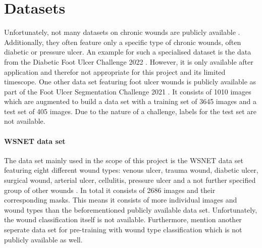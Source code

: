 \section{Datasets}

Unfortunately, not many datasets on chronic wounds are publicly available \cite{Oota_2023_WACV}. Additionally, they often feature only a specific type of chronic wounds, often diabetic or pressure ulcer. An example for such a specialised dataset is the data from the Diabetic Foot Ulcer Challenge 2022 \cite{DFUC2022}. However, it is only available after application and therefor not appropriate for this project and its limited timescope. One other data set featuring foot ulcer wounds is publicly available as part of the Foot Ulcer Segmentation Challenge 2021 \cite{Wang2020}. It consists of 1010 images which are augmented to build a data set with a training set of 3645 images and a test set of 405 images. Due to the nature of a challenge, labels for the test set are not available.

\paragraph{WSNET data set} The data set mainly used in the scope of this project is the WSNET data set featuring eight different wound types: venous ulcer, trauma wound, diabetic ulcer, surgical wound, arterial ulcer, cellulitis, pressure ulcer and a not further specified group of other wounds \cite{Oota_2023_WACV, Oota_2021_WACV}. In total it consists of 2686 images and their corresponding masks. This means it consists of more individual images and wound types than the beforementioned publicly available data set. Unfortunately, the wound classification itself is not available. Furthermore, \citeauthor{Oota_2023_WACV} mention another seperate data set for pre-training with wound type classification which is not publicly available as well.